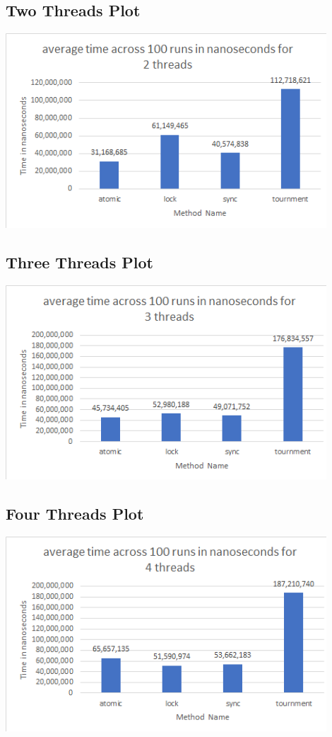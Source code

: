 \documentclass{article}
\begin{document}
\subsection{Two Threads Plot}
\includegraphics[width=12cm]{2_threads}

\subsection{Three Threads Plot}
\includegraphics[width=12cm]{3_threads}

\subsection{Four Threads Plot}
\includegraphics[width=12cm]{4_threads}
\end{document}
